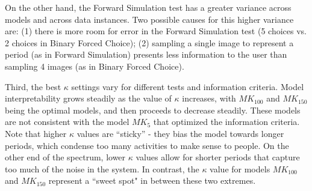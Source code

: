 \documentclass[letterpaper]{article} %
\begin{document}
On the other hand, the Forward Simulation test has a greater variance across models and across data instances.
Two possible causes for this higher variance are: (1) there is more room for error in the Forward Simulation test (5 choices vs. 2 choices in Binary Forced Choice); (2) sampling a single image to represent a period (as in Forward Simulation) presents less information to the user than sampling 4 images (as in Binary Forced Choice).

Third, the best $\kappa$ settings vary for different tests and information criteria.
Model interpretability grows steadily as the value of $\kappa$ increases, with $MK_{100}$ and $MK_{150}$ being the optimal models, and then proceeds to decrease steadily.
These models are not consistent with the model $MK_5$ that optimized the information criteria.
Note that higher $\kappa$ values are ``sticky'' - they  bias the model towards longer periods, which condense too many activities to make sense to people.
On the other end of the spectrum, lower $\kappa$ values allow for shorter periods that capture too much of the noise in the system.
In contrast, the $\kappa$ value for  models $MK_{100}$ and $MK_{150}$
represent a ``sweet spot" in between these two extremes.
\end{document}
